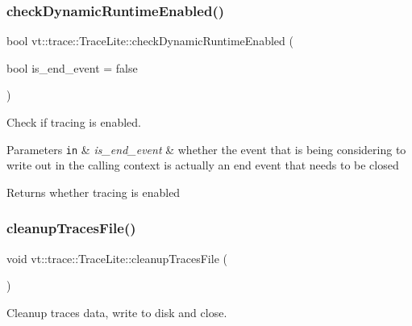 \subsubsection{\texorpdfstring{check\+Dynamic\+Runtime\+Enabled()}{checkDynamicRuntimeEnabled()}}
{\footnotesize\ttfamily bool vt\+::trace\+::\+Trace\+Lite\+::check\+Dynamic\+Runtime\+Enabled (\begin{DoxyParamCaption}\item[{bool}]{is\+\_\+end\+\_\+event = {\ttfamily false} }\end{DoxyParamCaption})}



Check if tracing is enabled. 


\begin{DoxyParams}[1]{Parameters}
\mbox{\tt in}  & {\em is\+\_\+end\+\_\+event} & whether the event that is being considering to write out in the calling context is actually an end event that needs to be closed\\
\hline
\end{DoxyParams}
\begin{DoxyReturn}{Returns}
whether tracing is enabled 
\end{DoxyReturn}
\mbox{\label{structvt_1_1trace_1_1_trace_lite_ac412f235b5e5b4510d848fa0b3b6a539}} 
\subsubsection{\texorpdfstring{cleanup\+Traces\+File()}{cleanupTracesFile()}}
{\footnotesize\ttfamily void vt\+::trace\+::\+Trace\+Lite\+::cleanup\+Traces\+File (\begin{DoxyParamCaption}{ }\end{DoxyParamCaption})}



Cleanup traces data, write to disk and close. 

\mbox{\label{structvt_1_1trace_1_1_trace_lite_ac494fd6858647fd548b6554cf066568b}} 
